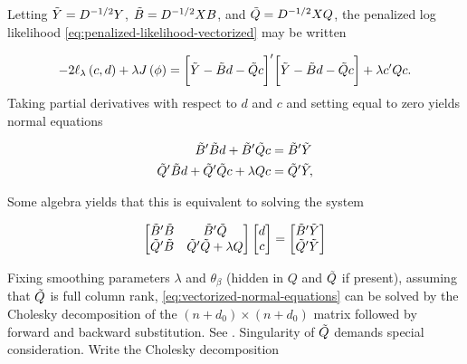 Letting $\tilde{Y} = D^{-1/2} Y$, $\tilde{B} = D^{-1/2} X B $, and $\tilde{Q} = D^{-1/2} X Q$, the penalized log likelihood \ref{eq:penalized-likelihood-vectorized} may be written

\begin{equation}\label{eq:penalized-loglik-tilde-vectorized}
-2\ell_\lambda \left(c, d \right) + \lambda J\left( \phi \right) = \bigg[ \tilde{Y} - \tilde{B} d - \tilde{Q} c\bigg]'\bigg[ \tilde{Y} - \tilde{B} d - \tilde{Q} c\bigg] + \lambda c'Qc.
\end{equation}
\noindent
Taking partial derivatives with respect to $d$ and $c$ and setting equal to zero yields normal equations 

\begin{align}
\begin{split}
\tilde{B}'\tilde{B} d + \tilde{B}'\tilde{Q} c &= \tilde{B}' \tilde{Y} \\
\tilde{Q}'\tilde{B} d + \tilde{Q}'\tilde{Q} c + \lambda Q c &= \tilde{Q}' \tilde{Y}, 
\end{split}
\end{align}

\noindent
Some algebra yields that this is equivalent to solving the system

\begin{equation} \label{eq:vectorized-normal-equations}
\begin{bmatrix}
\tilde{B}'\tilde{B} & \tilde{B}'\tilde{Q} \\
\tilde{Q}'\tilde{B} & \tilde{Q}'\tilde{Q} + \lambda Q\\
\end{bmatrix}
\begin{bmatrix}
d\\
c\\
\end{bmatrix}
= \begin{bmatrix}
\tilde{B}'\tilde{Y} \\
 \tilde{Q}'\tilde{Y}\\
\end{bmatrix}
\end{equation}


Fixing smoothing parameters $\lambda$ and $\theta_\beta$ (hidden in $Q$ and $\tilde{Q}$ if present), assuming that $\tilde{Q}$ is full column rank, \ref{eq:vectorized-normal-equations} can be solved by the Cholesky decomposition of the $\left( n + d_0 \right) \times \left( n + d_0 \right)$ matrix followed by forward and backward substitution. See \cite{golub2012matrix}. Singularity of $\tilde{Q}$ demands special consideration. Write the Cholesky decomposition

